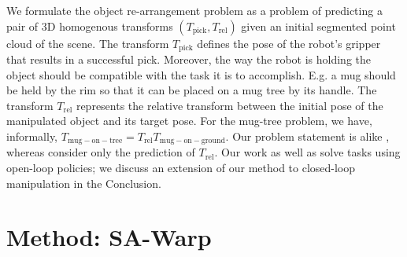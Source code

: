 \documentclass{article}
\begin{document}
We formulate the object re-arrangement problem as a problem of predicting a pair of 3D homogenous transforms $(T_\mathrm{pick}, T_\mathrm{rel})$ given an initial segmented point cloud of the scene. The transform $T_\mathrm{pick}$ defines the pose of the robot's gripper that results in a successful pick. Moreover, the way the robot is holding the object should be compatible with the task it is to accomplish. E.g. a mug should be held by the rim so that it can be placed on a mug tree by its handle. The transform $T_\mathrm{rel}$ represents the relative transform between the initial pose of the manipulated object and its target pose. For the mug-tree problem, we have, informally, $T_{\mathrm{mug-on-tree}} = T_\mathrm{rel} T_{\mathrm{mug-on-ground}}$. Our problem statement is alike \cite{simeonov22Neurala,simeonov22SE}, whereas \cite{pan22TAXPose} consider only the prediction of $T_\mathrm{rel}$. Our work as well as \cite{simeonov22Neurala,simeonov22SE,pan22TAXPose} solve tasks using open-loop policies; we discuss an extension of our method to closed-loop manipulation in the Conclusion.

\section{Method: SA-Warp}
\end{document}

